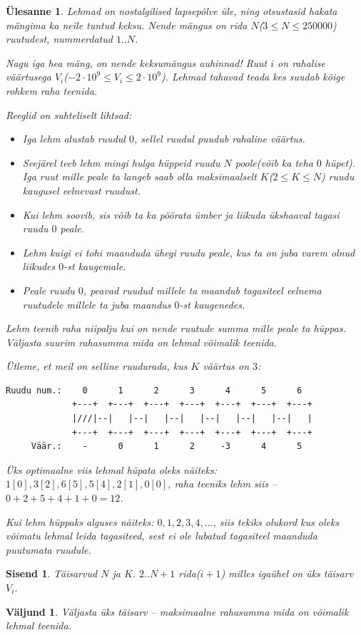\documentclass{trkut}
\newtheorem*{Input}{Sisend}
\newtheorem*{Output}{Väljund}
\newtheorem*{Text}{Ülesanne}
\begin{document}
\begin{Text}
Lehmad on nostalgilised lapsepõlve üle, ning otsustasid hakata mängima ka neile tuntud keksu. Nende mängus on rida $N$($3\le N\le 250000$) ruutudest, nummerdatud $1..N$.

Nagu iga hea mäng, on nende keksumängus auhinnad! Ruut $i$ on rahalise väärtusega $V_i$($-2\cdot 10^9\le V_i\le 2\cdot 10^9$). Lehmad tahavad teada kes suudab kõige rohkem raha teenida.

Reeglid on suhteliselt lihtsad:
\begin{itemize}
    \item Iga lehm alustab ruudul $0$, sellel ruudul puudub rahaline väärtus.
    \item Seejärel teeb lehm mingi hulga hüppeid ruudu $N$ poole(võib ka teha $0$ hüpet). Iga ruut mille peale ta langeb saab olla maksimaalselt $K$($2\le K\le N$) ruudu kaugusel eelnevast ruudust.
    \item Kui lehm soovib, sis võib ta ka pöörata ümber ja liikuda ükshaaval tagasi ruudu $0$ peale.
    \item Lehm kuigi ei tohi maanduda ühegi ruudu peale, kus ta on juba varem olnud liikudes $0$-st kaugemale.
    \item Peale ruudu $0$, peavad ruudud millele ta maandub tagasiteel eelnema ruutudele millele ta juba maandus $0$-st kaugenedes.
\end{itemize}

Lehm teenib raha niipalju kui on nende ruutude summa mille peale ta hüppas. Väljasta suurim rahasumma mida on lehmal võimalik teenida.

Ütleme, et meil on selline ruudurada, kus $K$ väärtus on $3$:
\begin{verbatim}
Ruudu num.:    0      1      2      3      4      5      6
             +---+  +---+  +---+  +---+  +---+  +---+  +---+
             |///|--|   |--|   |--|   |--|   |--|   |--|   |
             +---+  +---+  +---+  +---+  +---+  +---+  +---+
     Väär.:    -      0      1      2     -3      4      5
\end{verbatim}
Üks optimaalne viis lehmal hüpata oleks näiteks: $1[0], 3[2], 6[5], 5[4], 2[1], 0[0]$, raha teeniks lehm siis -- $0+2+5+4+1+0=12$.

Kui lehm hüppaks alguses näiteks: $0, 1, 2, 3, 4, ...$, siis tekiks olukord kus oleks võimatu lehmal leida tagasiteed, sest ei ole lubatud tagasiteel maanduda puutumata ruudule.

\parencite{18}
\end{Text}
\begin{Input}
Täisarvud $N$ ja $K$.
$2..N+1$ rida($i+1$) milles igaühel on üks täisarv $V_i$.
\end{Input}
\begin{Output}
Väljasta üks täisarv -- maksimaalne rahasumma mida on võimalik lehmal teenida.
\end{Output}
\end{document}
